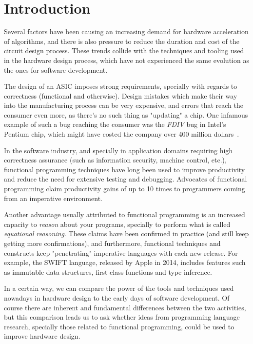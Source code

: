 \chapter{Introduction}
\label{chap:intro}
    Several factors have been causing an increasing demand for hardware acceleration of algorithms,
    and there is also pressure to reduce the duration and cost of the circuit design process.
    These trends collide with the techniques and tooling used in the hardware design process,
    which have not experienced the same evolution as the ones for software development.

    The design of an \ac{ASIC} imposes strong requirements,
    specially with regards to correctness (functional and otherwise).
    Design mistakes which make their way into the manufacturing process can be very expensive,
    and errors that reach the consumer even more, as there's no such thing as "updating" a chip.
    One infamous example of such a bug reaching the consumer was the \emph{FDIV} bug in Intel's Pentium chip,
    which might have costed the company over 400 million dollars~\cite{intel-fdiv}.

    In the software industry, and specially
    in application domains requiring high correctness assurance (such as information security, machine control, etc.),
    functional programming techniques have long been used to improve productivity
    and reduce the need for extensive testing and debugging.
    Advocates of functional programming claim productivity gains of up to 10 times to
    programmers coming from an imperative environment.

    Another advantage usually attributed to functional programming is an increased capacity to
    \emph{reason} about your programs, specially to perform what is called \emph{equational reasoning}.
    These claims have been confirmed in practice (and still keep getting more confirmations),
    and furthermore, functional techniques and constructs keep "penetrating" imperative languages
    with each new release. For example, the SWIFT language, released by Apple in 2014,
    includes features such as immutable data structures, first-class functions and type inference.


    In a certain way, we can compare the power of the tools and techniques
    used nowadays in hardware design to the early days of software development.
    Of course there are inherent and fundamental differences between the two activities, but
    this comparison leads us to ask whether ideas from programming language research,
    specially those related to functional programming, could be used to improve hardware design.

